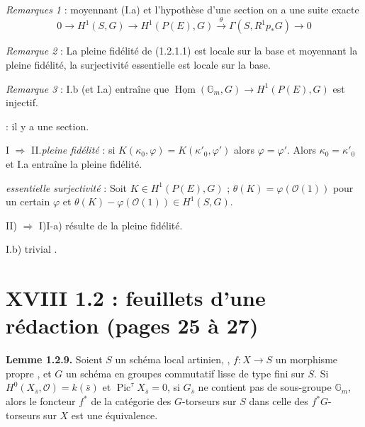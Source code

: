 \documentclass[11pt,a4paper]{article}
\begin{document}
\emph{Remarques 1} :  moyennant (I.a) et l'hypothèse d'une
section on a une suite exacte
\[
0 \to H^1(S, G) \to H^1(P(E), G) \xrightarrow{\ \theta\ } \Gamma(S, R^1 p_{*} G) \to 0
\]

\emph{Remarque 2} : La pleine fidélité de (1.2.1.1) est locale sur la base et
moyennant la pleine fidélité, la surjectivité essentielle est locale sur la
base.

\emph{Remarque 3} : I.b (et I.a) entraîne que $\underline{\operatorname{Hom}}(\mathbb{G}_m, G)
\to H^1(P(E), G)$ est injectif.

  :  il y a une section.

I $\Rightarrow$ II.\quad \emph{pleine fidélité} : si $K(\kappa_0, \varphi) =
K(\kappa'_0, \varphi')$ alors $\varphi = \varphi'$. Alors $\kappa_0 =
\kappa'_0$ et I.a entraîne la pleine fidélité.

\emph{essentielle surjectivité} : Soit $K \in H^1(P(E), G)$ ; $\theta(K) =
\varphi(\mathcal{O}(1))$ pour un certain $\varphi$ et $\theta(K) -
\varphi(\mathcal{O}(1)) \in H^1(S, G)$.

II) $\Rightarrow$ I)\quad I-a) résulte de la pleine fidélité.

I.b)  trivial
.

\section*{XVIII 1.2 : feuillets d'une rédaction (pages 25 à 27)}


\textbf{Lemme 1.2.9.} Soient $S$ un schéma local
artinien, , $f : X \to S$ un
morphisme propre  \struck{\ill{}}, \struck{\ill{}} et $G$ un
schéma en groupes commutatif lisse de type fini sur $S$. Si $H^0(X_{\bar s},
\mathcal{O}) = k(\bar s)$ et $\operatorname{Pic}^{\tau} X_{\bar s} = 0$,
  si $G_{\bar s}$ ne contient pas de
sous-groupe $\mathbb{G}_m$, alors le  foncteur $f^{*}$ de la
catégorie des $G$-torseurs sur $S$ dans celle des $f^{*}G$-torseurs sur $X$
est une équivalence.
\end{document}
